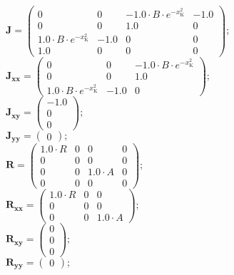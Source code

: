 \documentclass[11pt, oneside]{article}      %
\begin{document}
%
$ \mathbf{J} = \left(\begin{array}{cccc}0 & 0 & - 1.0 \cdot B \cdot e^{- x_{\mathrm{K}}^{2}} & -1.0\\0 & 0 & 1.0 & 0\\1.0 \cdot B \cdot e^{- x_{\mathrm{K}}^{2}} & -1.0 & 0 & 0\\1.0 & 0 & 0 & 0\end{array}\right) ; $ 
%
\\
%
$ \mathbf{J_{xx}} = \left(\begin{array}{ccc}0 & 0 & - 1.0 \cdot B \cdot e^{- x_{\mathrm{K}}^{2}}\\0 & 0 & 1.0\\1.0 \cdot B \cdot e^{- x_{\mathrm{K}}^{2}} & -1.0 & 0\end{array}\right) ; $ 
%
\\
%
$ \mathbf{J_{xy}} = \left(\begin{array}{c}-1.0\\0\\0\end{array}\right) ; $ 
%
\\
%
$ \mathbf{J_{yy}} = \left(\begin{array}{c}0\end{array}\right) ; $ 
%
\\
%

%
$ \mathbf{R} = \left(\begin{array}{cccc}1.0 \cdot R & 0 & 0 & 0\\0 & 0 & 0 & 0\\0 & 0 & 1.0 \cdot A & 0\\0 & 0 & 0 & 0\end{array}\right) ; $ 
%
\\
%
$ \mathbf{R_{xx}} = \left(\begin{array}{ccc}1.0 \cdot R & 0 & 0\\0 & 0 & 0\\0 & 0 & 1.0 \cdot A\end{array}\right) ; $ 
%
\\
%
$ \mathbf{R_{xy}} = \left(\begin{array}{c}0\\0\\0\end{array}\right) ; $ 
%
\\
%
$ \mathbf{R_{yy}} = \left(\begin{array}{c}0\end{array}\right) ; $ 
%
\\
%
\end{document}
